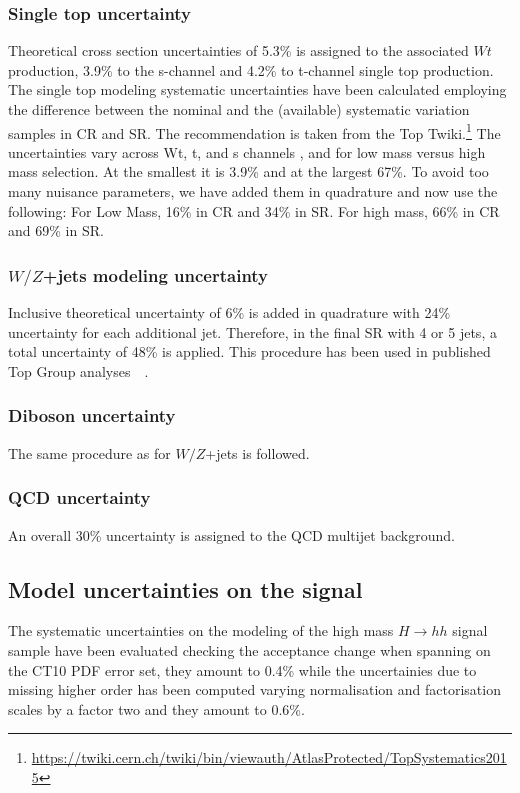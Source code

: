 \subsubsection{Single top uncertainty}
Theoretical cross section uncertainties of 5.3\% is assigned to the associated $Wt$ production,  3.9\% to the s-channel and 4.2\% to t-channel single top production.  The single top modeling systematic uncertainties have been calculated employing the difference between the nominal and the (available) systematic variation samples in CR and SR. The recommendation is taken from the Top Twiki.{\footnote {\url{https://twiki.cern.ch/twiki/bin/viewauth/AtlasProtected/TopSystematics2015}}} 
The uncertainties vary across Wt, t, and s channels , and for low mass versus high mass selection. At the smallest it is 3.9\% and at the largest 67\%. To avoid too many nuisance parameters, we have added them in quadrature and now use the following: For Low Mass, 16\% in CR and 34\% in SR. For high mass, 66\% in CR and 69\% in SR.


\subsubsection{$W/Z$+jets modeling uncertainty}
\label{sec:WjetsModeling}
Inclusive theoretical uncertainty of 6\% is added in quadrature with 24\% uncertainty for each additional jet. Therefore, in the final SR with 4 or 5 jets, a total uncertainty of 48\% is applied. This procedure has been used in published Top Group analyses~~\cite{Alwall2008}. 

\subsubsection{Diboson uncertainty}
The same procedure as for $W/Z$+jets is followed. 


\subsubsection{QCD uncertainty}
An overall 30\% uncertainty is assigned to the QCD multijet background. 


\subsection{Model uncertainties on the signal}

The systematic uncertainties on the modeling of the high mass
$H\rightarrow hh$ signal sample have been evaluated checking the
acceptance change when spanning on the CT10 PDF error set, they amount
to 0.4\% while the uncertainies due to missing higher order has been
computed varying normalisation and factorisation scales by a factor
two and they amount to 0.6\%.

\clearpage